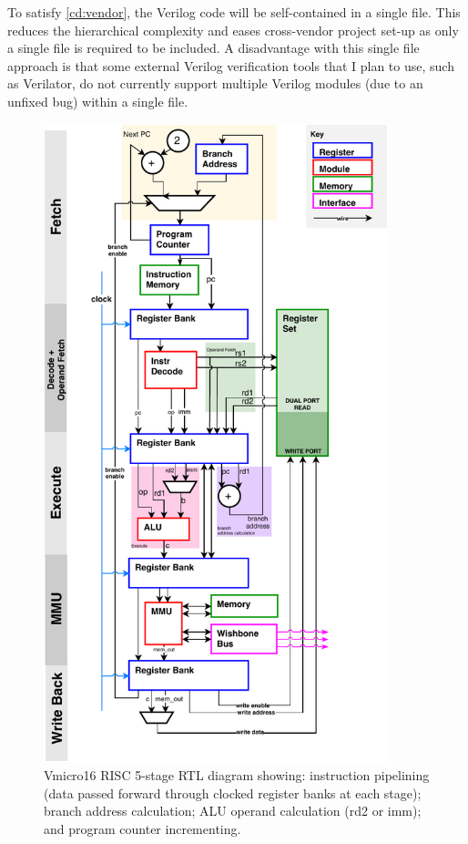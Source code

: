 To satisfy \ref{cd:vendor}, the Verilog code will be self-contained in a single file. This reduces the hierarchical complexity and eases cross-vendor project set-up as only a single file is required to be included. 
A disadvantage with this single file approach is that some external Verilog verification tools that I plan to use, such as Verilator, do not currently support multiple Verilog modules (due to an unfixed bug) within a single file. 

\begin{figure}[H]
\centering 
\includegraphics[width=10cm]{../img/risc}
\caption{Vmicro16 RISC 5-stage RTL diagram showing: instruction pipelining (data passed forward through clocked register banks at each stage); branch address calculation; ALU operand calculation (rd2 or imm); and program counter incrementing.}
\label{fig:risc}
\end{figure}


